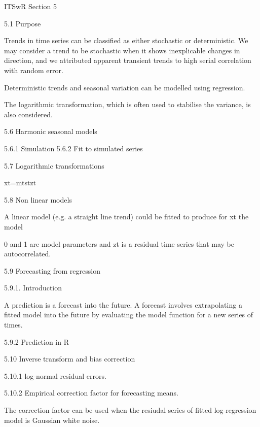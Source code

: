 ITSwR Section 5
 
5.1 Purpose
 
Trends in time series can be classified as either stochastic or deterministic. We may consider a trend to be stochastic when it shows inexplicable changes in direction, and we attributed apparent transient trends to high serial correlation with random error.
 
Deterministic trends and seasonal variation can be modelled using regression.
 
The logarithmic transformation, which is often used to stabilise the variance, is also considered.
 
5.6 Harmonic seasonal models
 
5.6.1 Simulation
5.6.2 Fit to simulated series 
 
5.7 Logarithmic transformations
 
xt=mtstzt
 

 
5.8 Non linear models
 
A linear model (e.g. a straight line trend) could be fitted to produce for {xt} the model
 
 
 
0 and 1 are model parameters and {zt} is a residual time series that may be autocorrelated.
 
 
5.9 Forecasting from regression
 
5.9.1. Introduction
 
A prediction is a forecast into the future. A forecast involves extrapolating a fitted model into the future by evaluating the model function for a new series of times.
 
5.9.2 Prediction in R
 
5.10 Inverse transform and bias correction
 
5.10.1 log-normal residual errors.
 
5.10.2 Empirical correction factor for forecasting means.
 
The correction factor can be used when the resiudal series of fitted log-regression model is Gaussian white noise.
